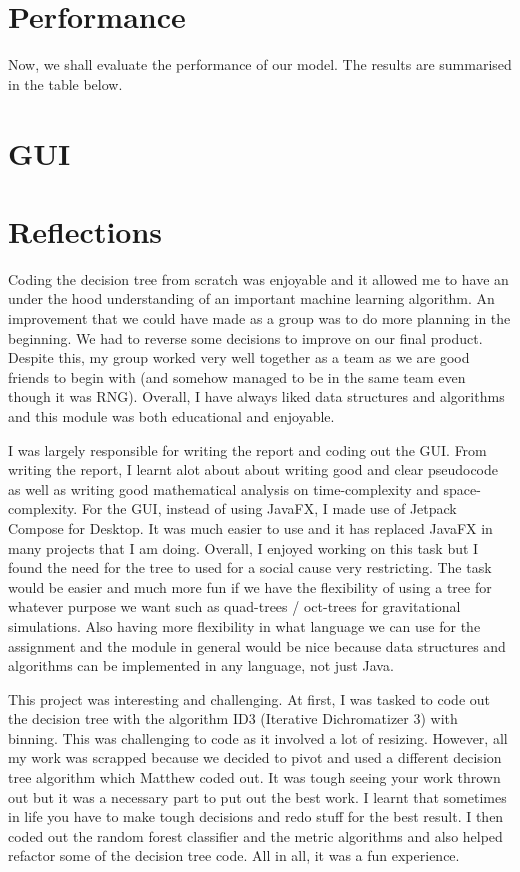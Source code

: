 \section{Performance}

Now, we shall evaluate the performance of our model. The results are summarised in the table below.

\section{GUI}


\section{Reflections}
 Coding the decision tree from scratch was enjoyable and it allowed me to have an under the hood understanding of an important machine learning algorithm. An improvement that we could have made as a group was to do more planning in the beginning. We had to reverse some decisions to improve on our final product. Despite this, my group worked very well together as a team as we are good friends to begin with (and somehow managed to be in the same team even though it was RNG). Overall, I have always liked data structures and algorithms and this module was both educational and enjoyable.

 I was largely responsible for writing the report and coding out the GUI. From writing the report, I learnt alot about about writing good and clear pseudocode as well as writing good mathematical analysis on time-complexity and space-complexity. For the GUI, instead of using JavaFX, I made use of Jetpack Compose for Desktop. It was much easier to use and it has replaced JavaFX in many projects that I am doing. Overall, I enjoyed working on this task but I found the need for the tree to used for a social cause very restricting. The task would be easier and much more fun if we have the flexibility of using a tree for whatever purpose we want such as quad-trees / oct-trees for gravitational simulations. Also having more flexibility in what language we can use for the assignment and the module in general would be nice because data structures and algorithms can be implemented in any language, not just Java.

 This project was interesting and challenging. At first, I was tasked to code out the decision tree with the algorithm ID3 (Iterative Dichromatizer 3) with binning. This was challenging to code as it involved a lot of resizing. However, all my work was scrapped because we decided to pivot and used a different decision tree algorithm which Matthew coded out. It was tough seeing your work thrown out but it was a necessary part to put out the best work. I learnt that sometimes in life you have to make tough decisions and redo stuff for the best result. I then coded out the random forest classifier and the metric algorithms and also helped refactor some of the decision tree code. All in all, it was a fun experience.

